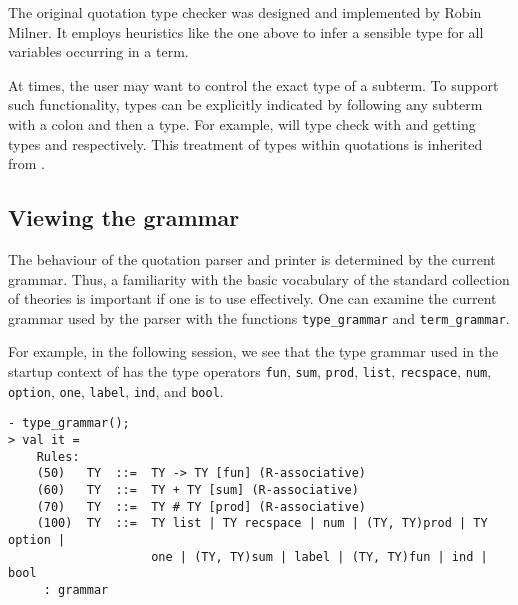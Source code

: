 The original quotation type checker was designed and implemented by
Robin Milner.  It employs heuristics like the one
above to infer a sensible type for all variables occurring in a term.

 At times, the
user may want to control the exact type of a subterm. To support such
functionality, types can be explicitly indicated by following any
subterm with a colon and then a type.  For example,
 will type check with  and
 getting types  and 
respectively.  This treatment of types within quotations is inherited
from \LCF.
%

\subsection{Viewing the grammar}

The behaviour of the \HOL{} quotation parser and printer is determined
by the current grammar. Thus, a familiarity with the basic vocabulary
of the standard collection of \HOL{} theories is important if one is
to use \HOL{} effectively. One can examine the current grammar used by
the parser with the functions \verb+type_grammar+ and
\verb+term_grammar+.

For example, in the following session, we see that the type grammar
used in the startup context of \HOL{} has the type operators
\verb+fun+, \verb+sum+, \verb+prod+, \verb+list+, \verb+recspace+,
\verb+num+, \verb+option+, \verb+one+, \verb+label+, \verb+ind+, and
\verb+bool+.

\setcounter{sessioncount}{0}
\begin{session}
\begin{verbatim}
- type_grammar();
> val it =
    Rules:
    (50)   TY  ::=  TY -> TY [fun] (R-associative)
    (60)   TY  ::=  TY + TY [sum] (R-associative)
    (70)   TY  ::=  TY # TY [prod] (R-associative)
    (100)  TY  ::=  TY list | TY recspace | num | (TY, TY)prod | TY option |
                    one | (TY, TY)sum | label | (TY, TY)fun | ind | bool
     : grammar
\end{verbatim}
\end{session}

